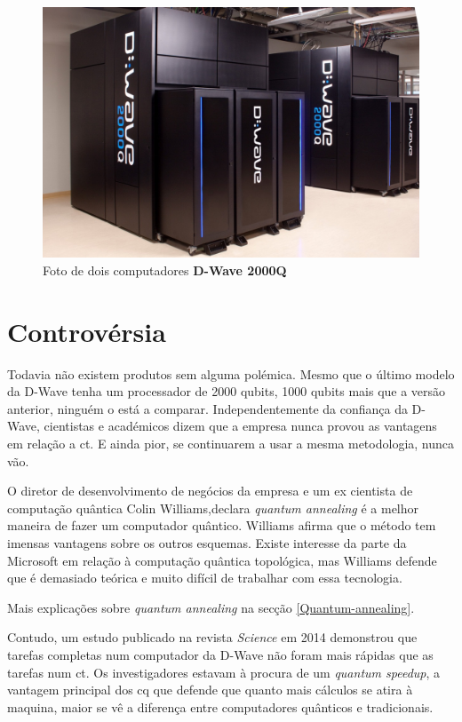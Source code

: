\documentclass{report}
\begin{document}
	\begin{figure}[!h]
		\centering
		\includegraphics[scale=0.18]{D-Wave-2000Q.jpg} 
		\caption{Foto de dois computadores \textbf{D-Wave 2000Q}}
		\label{D-Wave}		
	\end{figure} 

\section{Controvérsia}
\label{controvérsia}

	Todavia não existem produtos sem alguma polémica. Mesmo que o último modelo da D-Wave tenha um processador de 2000 qubits, 1000 qubits mais que a versão anterior, ninguém o está a comparar. Independentemente da confiança da D-Wave, cientistas e académicos dizem que a empresa nunca provou as vantagens em relação a \ac{ct}. E ainda pior, se continuarem a usar a mesma metodologia, nunca vão.
	
	O diretor de desenvolvimento de negócios da empresa e um ex cientista de computação quântica Colin Williams,declara \emph{quantum annealing} é a melhor maneira de fazer um computador quântico. Williams afirma que o método tem imensas vantagens sobre os outros esquemas. Existe interesse da parte da Microsoft em relação à computação quântica topológica, mas Williams defende que é demasiado teórica e muito difícil de trabalhar com essa tecnologia.

	Mais explicações sobre \emph{quantum annealing} na secção \ref{Quantum-annealing}.
		
	Contudo, um estudo publicado na revista \textit{Science} em 2014 demonstrou que tarefas completas num computador da D-Wave não foram mais rápidas que as tarefas num \ac{ct}. Os investigadores estavam à procura de um \emph{quantum speedup}, a vantagem principal dos \ac{cq} que defende que quanto mais cálculos se atira à maquina, maior se vê a diferença entre computadores quânticos e tradicionais. 
	
\end{document}

